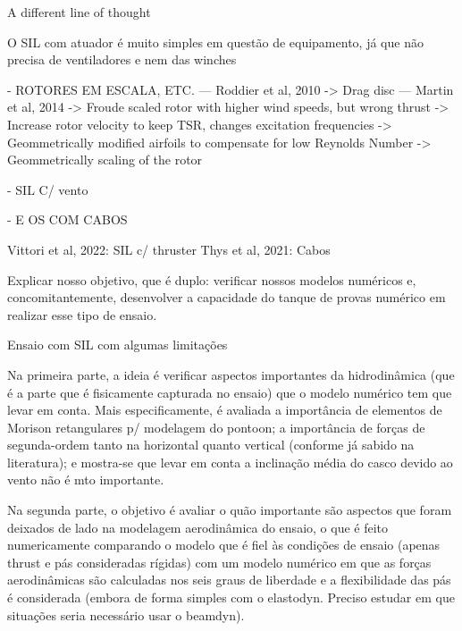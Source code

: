 A different line of thought 



O SIL com atuador é muito simples em questão de equipamento, já que não precisa de ventiladores e nem das winches


- ROTORES EM ESCALA, ETC. 
--- Roddier et al, 2010 -> Drag disc
--- Martin et al, 2014 
    -> Froude scaled rotor with higher wind speeds, but wrong thrust
    -> Increase rotor velocity to keep TSR, changes excitation frequencies
    -> Geommetrically modified airfoils to compensate for low Reynolds Number -> Geommetrically scaling of the rotor

- SIL C/ vento

- E OS COM CABOS


Vittori et al, 2022: SIL c/ thruster
Thys et al, 2021: Cabos



Explicar nosso objetivo, que é duplo: verificar nossos modelos numéricos e, concomitantemente, desenvolver a capacidade do tanque de provas numérico em realizar esse tipo de ensaio.

Ensaio com SIL com algumas limitações

Na primeira parte, a ideia é verificar aspectos importantes da hidrodinâmica (que é a parte que é fisicamente capturada no ensaio) que o modelo numérico tem que levar em conta. Mais especificamente, é avaliada a importância de elementos de Morison retangulares p/ modelagem do pontoon; a importância de forças de segunda-ordem tanto na horizontal quanto vertical (conforme já sabido na literatura); e mostra-se que levar em conta a inclinação média do casco devido ao vento não é mto importante.

Na segunda parte, o objetivo é avaliar o quão importante são aspectos que foram deixados de lado na modelagem aerodinâmica do ensaio, o que é feito numericamente comparando o modelo que é fiel às condições de ensaio (apenas thrust e pás consideradas rígidas) com um modelo numérico em que as forças aerodinâmicas são calculadas nos seis graus de liberdade e a flexibilidade das pás é considerada (embora de forma simples com o elastodyn. Preciso estudar em que situações seria necessário usar o beamdyn).